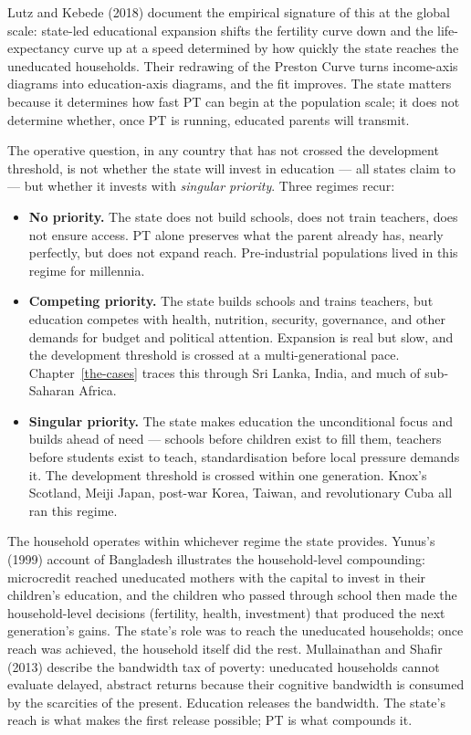 \documentclass[12pt,letterpaper]{article}
\begin{document}
Lutz and Kebede (2018) document the empirical signature of this at
the global scale: state-led educational expansion shifts the
fertility curve down and the life-expectancy curve up at a speed
determined by how quickly the state reaches the uneducated
households. Their redrawing of the Preston Curve turns income-axis
diagrams into education-axis diagrams, and the fit improves. The
state matters because it determines how fast PT can begin at the
population scale; it does not determine whether, once PT is running,
educated parents will transmit.

The operative question, in any country that has not crossed the
development threshold, is not whether the state will invest in
education --- all states claim to --- but whether it invests with
\emph{singular priority}. Three regimes recur:

\begin{itemize}
\item \textbf{No priority.} The state does not build schools, does
not train teachers, does not ensure access. PT alone preserves what
the parent already has, nearly perfectly, but does not expand reach.
Pre-industrial populations lived in this regime for millennia.

\item \textbf{Competing priority.} The state builds schools and
trains teachers, but education competes with health, nutrition,
security, governance, and other demands for budget and political
attention. Expansion is real but slow, and the development threshold
is crossed at a multi-generational pace.
Chapter~\ref{the-cases} traces this through Sri Lanka, India, and
much of sub-Saharan Africa.

\item \textbf{Singular priority.} The state makes education the
unconditional focus and builds ahead of need --- schools before
children exist to fill them, teachers before students exist to teach,
standardisation before local pressure demands it. The development
threshold is crossed within one generation. Knox's Scotland, Meiji
Japan, post-war Korea, Taiwan, and revolutionary Cuba all ran this
regime.
\end{itemize}

The household operates within whichever regime the state provides.
Yunus's (1999) account of Bangladesh illustrates the household-level
compounding: microcredit reached uneducated mothers with the capital
to invest in their children's education, and the children who passed
through school then made the household-level decisions (fertility,
health, investment) that produced the next generation's gains. The
state's role was to reach the uneducated households; once reach was
achieved, the household itself did the rest. Mullainathan and Shafir
(2013) describe the bandwidth tax of poverty: uneducated households
cannot evaluate delayed, abstract returns because their cognitive
bandwidth is consumed by the scarcities of the present. Education
releases the bandwidth. The state's reach is what makes the first
release possible; PT is what compounds it.
\end{document}
